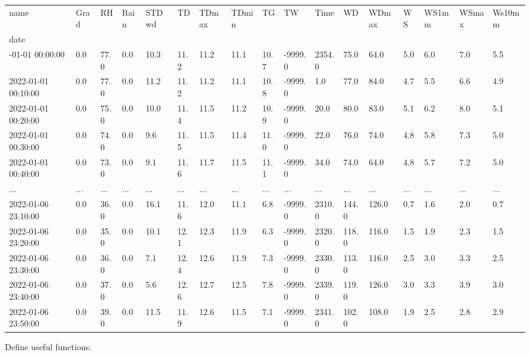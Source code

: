 \documentclass[
  letterpaper,
  DIV=11,
  numbers=noendperiod,
  oneside]{scrreprt}
\begin{document}
\begin{longtable}[]{@{}lllllllllllllllll@{}}
\toprule\noalign{}
name & Grad & RH & Rain & STDwd & TD & TDmax & TDmin & TG & TW & Time &
WD & WDmax & WS & WS1mm & WSmax & Ws10mm \\
date & & & & & & & & & & & & & & & & \\
\midrule\noalign{}
\endhead
\bottomrule\noalign{}
\endlastfoot
2022-01-01 00:00:00 & 0.0 & 77.0 & 0.0 & 10.3 & 11.2 & 11.2 & 11.1 &
10.7 & -9999.0 & 2354.0 & 75.0 & 64.0 & 5.0 & 6.0 & 7.0 & 5.5 \\
2022-01-01 00:10:00 & 0.0 & 77.0 & 0.0 & 11.2 & 11.2 & 11.2 & 11.1 &
10.8 & -9999.0 & 1.0 & 77.0 & 84.0 & 4.7 & 5.5 & 6.6 & 4.9 \\
2022-01-01 00:20:00 & 0.0 & 75.0 & 0.0 & 10.0 & 11.4 & 11.5 & 11.2 &
10.9 & -9999.0 & 20.0 & 80.0 & 83.0 & 5.1 & 6.2 & 8.0 & 5.1 \\
2022-01-01 00:30:00 & 0.0 & 74.0 & 0.0 & 9.6 & 11.5 & 11.5 & 11.4 & 11.0
& -9999.0 & 22.0 & 76.0 & 74.0 & 4.8 & 5.8 & 7.3 & 5.0 \\
2022-01-01 00:40:00 & 0.0 & 73.0 & 0.0 & 9.1 & 11.6 & 11.7 & 11.5 & 11.1
& -9999.0 & 34.0 & 74.0 & 64.0 & 4.8 & 5.7 & 7.2 & 5.0 \\
... & ... & ... & ... & ... & ... & ... & ... & ... & ... & ... & ... &
... & ... & ... & ... & ... \\
2022-01-06 23:10:00 & 0.0 & 36.0 & 0.0 & 16.1 & 11.6 & 12.0 & 11.1 & 6.8
& -9999.0 & 2310.0 & 144.0 & 126.0 & 0.7 & 1.6 & 2.0 & 0.7 \\
2022-01-06 23:20:00 & 0.0 & 35.0 & 0.0 & 10.1 & 12.1 & 12.3 & 11.9 & 6.3
& -9999.0 & 2320.0 & 118.0 & 116.0 & 1.5 & 1.9 & 2.3 & 1.5 \\
2022-01-06 23:30:00 & 0.0 & 36.0 & 0.0 & 7.1 & 12.4 & 12.6 & 11.9 & 7.3
& -9999.0 & 2330.0 & 113.0 & 116.0 & 2.5 & 3.0 & 3.3 & 2.5 \\
2022-01-06 23:40:00 & 0.0 & 37.0 & 0.0 & 5.6 & 12.6 & 12.7 & 12.5 & 7.8
& -9999.0 & 2339.0 & 119.0 & 126.0 & 3.0 & 3.3 & 3.9 & 3.0 \\
2022-01-06 23:50:00 & 0.0 & 39.0 & 0.0 & 11.5 & 11.9 & 12.6 & 11.5 & 7.1
& -9999.0 & 2341.0 & 102.0 & 108.0 & 1.9 & 2.5 & 2.8 & 2.9 \\
\end{longtable}

Define useful functions.
\end{document}
